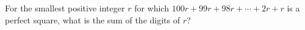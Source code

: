 For the smallest positive integer $r$ for which $100r+99r+98r+\cdots+2r+r$ is a perfect square, what is the sum of the digits of $r$?
